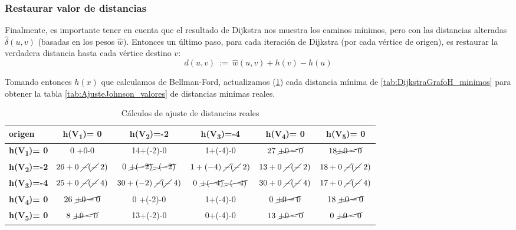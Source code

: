 \documentclass[../tp2_grupo404.tex]{subfiles}
\begin{document}
\subsubsection{Restaurar valor de distancias}\label{sec:parte1_4_3}
Finalmente, es importante tener en cuenta que el resultado de Dijkstra
nos muestra los caminos mínimos, pero con las distancias alteradas $\hat{\delta}(u,v)$
(basadas en los pesos $\hat{w}$). Entonces un último paso, para cada
iteración de Dijkstra (por cada vértice de origen), es restaurar la
verdadera distancia hasta cada vértice destino $v$:
$$d(u,v) ~:=~ \hat{w}(u,v) + h(v) - h(u)$$

Tomando entonces $h(x)$ que calculamos de Bellman-Ford,
actualizamos (\cref{tab:AjusteJohnson_calculos}) cada distancia mínima de \cref{tab:DijkstraGrafoH_minimos}
para obtener la tabla \cref{tab:AjusteJohnson_valores} de distancias mínimas reales.

\begin{table}[H]
    \centering
    \begin{tabular}{@{}lccccc@{}}
    \toprule
    \textbf{origen}
    & \textbf{h(V\textsubscript{1})= 0}
    & \textbf{h(V\textsubscript{2})=-2}
    & \textbf{h(V\textsubscript{3})=-4}
    & \textbf{h(V\textsubscript{4})= 0}
    & \textbf{h(V\textsubscript{5})= 0} \\ \midrule
    \textbf{h(V\textsubscript{1})= 0}  & 0 +0-0  & 14+(-2)-0  & 1+(-4)-0  & $27~\cancel{+0-0}$  & $18\cancel{+0-0}$  \\
    \textbf{h(V\textsubscript{2})=-2}  & $26+0~\cancel{-}(\cancel{-}~2)$  & $0 ~\cancel{+(-2)}\cancel{-(-2)}$  & $1+(-4)~\cancel{-}(\cancel{-}~2)$  & $13+0~\cancel{-}(\cancel{-}~2)$  & $18+0~\cancel{-}(\cancel{-}~2)$  \\
    \textbf{h(V\textsubscript{3})=-4}  & $25+0~\cancel{-}(\cancel{-}~4)$  & $30+(-2)~\cancel{-}(\cancel{-}~4)$  & $0~\cancel{+(-4)}\cancel{-(-4)}$  & $30+0~\cancel{-}(\cancel{-}~4)$  & $17+0~\cancel{-}(\cancel{-}~4)$  \\
    \textbf{h(V\textsubscript{4})= 0}  & $26~\cancel{+0-0}$  & 0 +(-2)-0  & 1+(-4)-0  & $0~\cancel{+0-0}$  & $18~\cancel{+0-0}$  \\
    \textbf{h(V\textsubscript{5})= 0}  & $8~ \cancel{+0-0}$  & 13+(-2)-0  & 0+(-4)-0  & $13~\cancel{+0-0}$  & $0 ~\cancel{+0-0}$  \\ \bottomrule
    \end{tabular}
    \caption{Cálculos de ajuste de distancias reales}
    \label{tab:AjusteJohnson_calculos}
\end{table}
\end{document}
